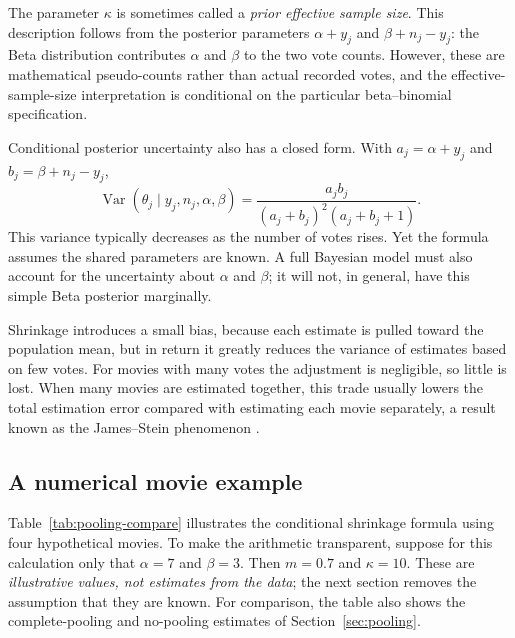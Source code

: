 \documentclass[11pt,a4paper]{article}
\newcommand{\Var}{\operatorname{Var}}
\begin{document}
The parameter $\kappa$ is sometimes called a \emph{prior effective sample size}. This description follows from the posterior parameters $\alpha+y_j$ and $\beta+n_j-y_j$: the Beta distribution contributes $\alpha$ and $\beta$ to the two vote counts. However, these are mathematical pseudo-counts rather than actual recorded votes, and the effective-sample-size interpretation is conditional on the particular beta--binomial specification.

Conditional posterior uncertainty also has a closed form. With $a_j=\alpha+y_j$ and $b_j=\beta+n_j-y_j$,
\begin{equation}
 \Var(\theta_j\mid y_j,n_j,\alpha,\beta)
 =\frac{a_jb_j}{(a_j+b_j)^2(a_j+b_j+1)}.
 \label{eq:conditional-var}
\end{equation}
This variance typically decreases as the number of votes rises. Yet the formula assumes the shared parameters are known. A full Bayesian model must also account for the uncertainty about $\alpha$ and $\beta$; it will not, in general, have this simple Beta posterior marginally.

Shrinkage introduces a small bias, because each estimate is pulled toward the population mean, but in return it greatly reduces the variance of estimates based on few votes. For movies with many votes the adjustment is negligible, so little is lost. When many movies are estimated together, this trade usually lowers the total estimation error compared with estimating each movie separately, a result known as the James--Stein phenomenon \cite{efronmorris1975}.

\subsection{A numerical movie example}
Table~\ref{tab:pooling-compare} illustrates the conditional shrinkage formula using four hypothetical movies. To make the arithmetic transparent, suppose for this calculation only that $\alpha=7$ and $\beta=3$. Then $m=0.7$ and $\kappa=10$. These are \emph{illustrative values, not estimates from the data}; the next section removes the assumption that they are known. For comparison, the table also shows the complete-pooling and no-pooling estimates of Section~\ref{sec:pooling}.
\end{document}
